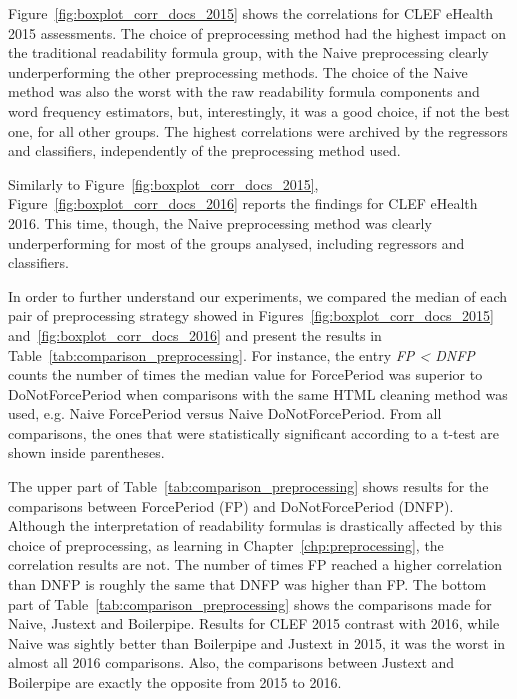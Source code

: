 \documentclass[runningheads,a4paper]{llncs}
\begin{document}
Figure~\ref{fig:boxplot_corr_docs_2015} shows the correlations for CLEF eHealth 2015 assessments.
The choice of preprocessing method had the highest impact on the traditional readability formula group, with the Naive preprocessing clearly underperforming the other preprocessing methods. The choice of the Naive method was also the worst with the raw readability formula components and word frequency estimators, but, interestingly, it was a good choice, if not the best one, for all other groups.
The highest correlations were archived by the regressors and classifiers, independently of the preprocessing method used.


Similarly to Figure~\ref{fig:boxplot_corr_docs_2015}, Figure~\ref{fig:boxplot_corr_docs_2016} reports the findings for CLEF eHealth 2016. This time, though, the Naive preprocessing method was clearly underperforming for most of the groups analysed, including regressors and classifiers.

In order to further understand our experiments, we compared the median of each pair of preprocessing strategy showed in Figures~\ref{fig:boxplot_corr_docs_2015} and~\ref{fig:boxplot_corr_docs_2016} and present the results in Table~\ref{tab:comparison_preprocessing}. 
For instance, the entry \textit{FP < DNFP} counts the number of times the median value for ForcePeriod was superior to DoNotForcePeriod when comparisons with the same HTML cleaning method was used, e.g. Naive ForcePeriod versus Naive DoNotForcePeriod. From all comparisons, the ones that were statistically significant according to a t-test are shown inside parentheses.

The upper part of Table~\ref{tab:comparison_preprocessing} shows results for the comparisons between ForcePeriod (FP) and DoNotForcePeriod (DNFP). Although the interpretation of readability formulas is drastically affected by this choice of preprocessing, as learning in Chapter~\ref{chp:preprocessing}, the correlation results are not.
The number of times FP reached a higher correlation than DNFP is roughly the same that DNFP was higher than FP.
The bottom part of Table~\ref{tab:comparison_preprocessing} shows the comparisons made for Naive, Justext and Boilerpipe. Results for CLEF 2015 contrast with 2016, while Naive was sightly better than Boilerpipe and Justext in 2015, it was the worst in almost all 2016 comparisons. Also, the comparisons between Justext and Boilerpipe are exactly the opposite from 2015 to 2016.
\end{document}
